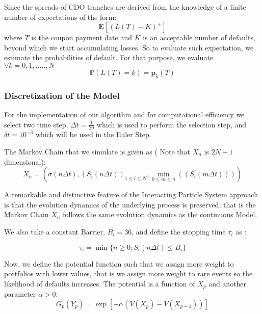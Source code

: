 Since the spreads of CDO tranches are derived from the knowledge of a finite
number of expectations of the form:
\begin{equation}
	\mathbf{E}[(L(T)-K)^{+}]
\end{equation}
where $T$ is the coupon payment date and $K$ is an acceptable number of defaults, 
beyond which we start accumulating losses. So to evaluate such expectation, we 
estimate the probabilities of default. For that purpose, we evaluate 
$\forall k = 0,1,.....,N$
\begin{equation}
	\mathbb{P}(L(T)=k) = \mathbf{p}_{k}(T)
\end{equation}

\subsubsection{Discretization of the Model}
\label{subsubsec:merton_discretization}
For the implementation of our algorithm and for computational efficiency we 
select two time step, $\Delta t = \frac{1}{20}$ which is used to perform the 
selection step, and $\delta t = 10^{-3}$ which will be used in the Euler Step.

The Markov Chain that we simulate is given as ( Note that $X_n$ is $2N + 1$ dimensional):
\begin{equation}
	\label{eq:merton_markov_chain}
	X_{n} = \left( \sigma \left( n \Delta t \right), \left( S_i \left( n \Delta
	t\right) \right)_{1 \leq i \leq N} , \min_{0 \leq m \leq n} \left( \left( S_i
	\left( m \Delta t \right) \right) \right) \right)
\end{equation}

A remarkable and distinctive feature of the Interacting Particle System approach 
is that the evolution dynamics of the underlying process is preserved, that is 
the Markov Chain $X_n$ follows the same evolution dynamics as the continuous Model.

We also take a constant Barrier, $B_i =36$, and define the stopping time $\tau_i$ as :

\begin{equation}
	\tau_i = \min \{ n \geq 0 : S_i(n \Delta t) \leq B_i \}
\end{equation}

Now, we define the potential function such that we assign more weight to portfolios 
with lower values, that is we assign more weight to rare events so the likelihood 
of defaults increases. The potential is a function of $X_p$ and another 
parameter $\alpha > 0$:
\begin{equation}
	\label{eq:merton_potential}
	G_{p}(Y_{p}) = \exp[-\alpha (V(X_p) - V(X_{p-1}))]
\end{equation}

